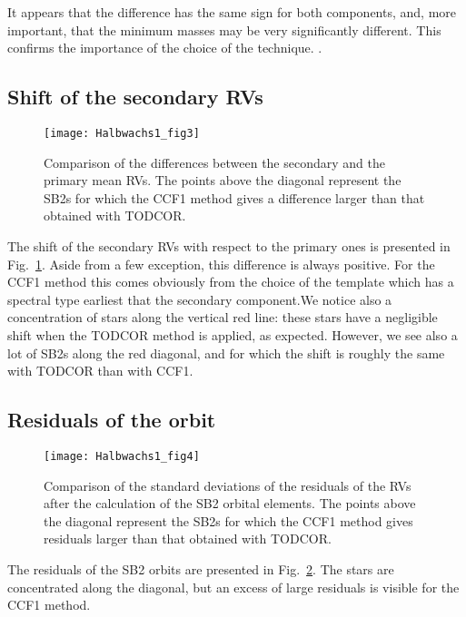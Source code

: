 \documentclass{sf2a-conf2017}
\begin{document}
It appears that the difference has the same sign for both components, and, more important, that the minimum masses may be 
very significantly different. This confirms the importance of the choice of the technique.
.
\subsection{Shift of the secondary RVs}

\begin{figure}[ht!]
 \centering
 \texttt{[image: Halbwachs1\_fig3]}      
  \caption{Comparison of the differences between the secondary and the primary mean RVs.
The points above the diagonal represent the SB2s for which the CCF1 method gives a difference larger than
that obtained with TODCOR.}
  \label{Halbwachs1:fig3}
\end{figure}

The shift of the secondary RVs with respect to the primary ones is presented in Fig.~\ref{Halbwachs1:fig3}.
Aside from a few exception, this difference is always positive. For the CCF1
method this comes obviously from the choice of the template which has a spectral type earliest that the
secondary component.We notice also a concentration of stars along the vertical red line: these stars
have a negligible shift when the TODCOR method is applied, as expected. However, we see also a lot
of SB2s along the red diagonal, and for which the shift is roughly the same with TODCOR than with CCF1.

\subsection{Residuals of the orbit}

\begin{figure}[ht!]
 \centering
 \texttt{[image: Halbwachs1\_fig4]}      
  \caption{Comparison of the standard deviations of the residuals of the RVs after the calculation of the
SB2 orbital elements.
The points above the diagonal represent the SB2s for which the CCF1 method gives residuals larger than
that obtained with TODCOR.}
  \label{Halbwachs1:fig4}
\end{figure}

The residuals of the SB2 orbits are presented in Fig.~\ref{Halbwachs1:fig4}. The stars are concentrated along the
diagonal, but an excess of large residuals is visible for the CCF1 method.
\end{document}
